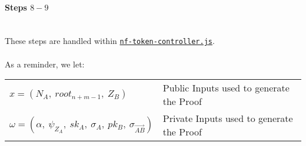 \documentclass{article}
\begin{document}
\paragraph{Steps $8 - 9$}
\ \\
These steps are handled within \hyperref[sec:nf-token-controller]{\texttt{nf-token-controller.js}}.\\
\\
As a reminder, we let:
\begin{center}
  \begin{tabular}{l l}
    $x = (N_{A},\
          root_{n+m-1},\
          Z_B)$ & Public Inputs used to generate the Proof\\
    $\omega = (\alpha,\
              \psi_{Z_A},\
              sk_A,\
              \sigma_{A},\
              pk_B,\
              \sigma_{\vec{AB}})$ & Private Inputs used to generate the Proof\\
  \end{tabular}
\end{center}
\end{document}
